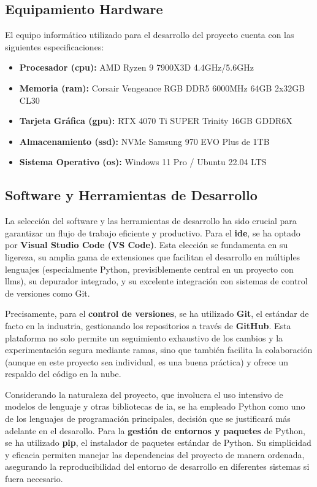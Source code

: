 \subsection{Equipamiento Hardware}
El equipo informático utilizado para el desarrollo del proyecto cuenta con las siguientes especificaciones:
\begin{itemize}
    \item \textbf{Procesador (\gls{cpu}):} AMD Ryzen 9 7900X3D 4.4GHz/5.6GHz
    \item \textbf{Memoria (\gls{ram}):} Corsair Vengeance RGB DDR5 6000MHz 64GB 2x32GB CL30
    \item \textbf{Tarjeta Gráfica (\gls{gpu}):} RTX 4070 Ti SUPER Trinity 16GB GDDR6X
    \item \textbf{Almacenamiento (\gls{ssd}):} NVMe Samsung 970 EVO Plus de 1TB
    \item \textbf{Sistema Operativo (\gls{os}):} Windows 11 Pro / Ubuntu 22.04 LTS
\end{itemize}

\subsection{Software y Herramientas de Desarrollo}
\label{subsec:software_herramientas}

La selección del software y las herramientas de desarrollo ha sido crucial para garantizar un flujo de trabajo eficiente y productivo. Para el \textbf{\gls{ide}}, se ha optado por \textbf{Visual Studio Code (VS Code)}. Esta elección se fundamenta en su ligereza, su amplia gama de extensiones que facilitan el desarrollo en múltiples lenguajes (especialmente Python, previsiblemente central en un proyecto con \glspl{llm}), su depurador integrado, y su excelente integración con sistemas de control de versiones como Git.

Precisamente, para el \textbf{control de versiones}, se ha utilizado \textbf{Git}, el estándar de facto en la industria, gestionando los repositorios a través de \textbf{GitHub}. Esta plataforma no solo permite un seguimiento exhaustivo de los cambios y la experimentación segura mediante ramas, sino que también facilita la colaboración (aunque en este proyecto sea individual, es una buena práctica) y ofrece un respaldo del código en la nube.

Considerando la naturaleza del proyecto, que involucra el uso intensivo de modelos de lenguaje y otras bibliotecas de \gls{ia}, se ha empleado Python como uno de los lenguajes de programación principales, decisión que se justificará más adelante en el desarollo. Para la \textbf{gestión de entornos y paquetes} de Python, se ha utilizado \textbf{pip}, el instalador de paquetes estándar de Python. Su simplicidad y eficacia permiten manejar las dependencias del proyecto de manera ordenada, asegurando la reproducibilidad del entorno de desarrollo en diferentes sistemas si fuera necesario.

